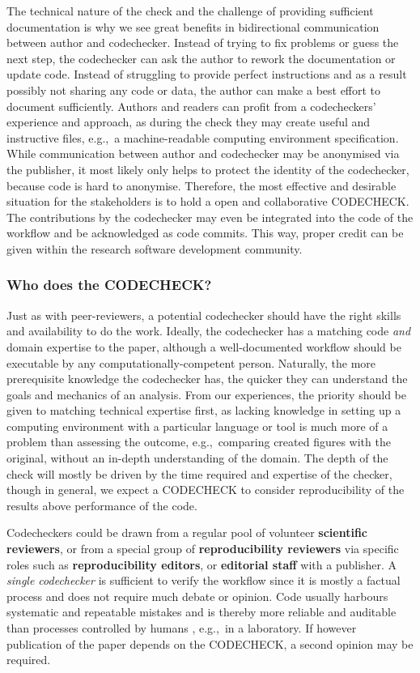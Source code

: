 \documentclass[12pt]{article}
\begin{document}
The technical nature of the check and the challenge of providing sufficient documentation is why we see great benefits in bidirectional communication between author and codechecker.
Instead of trying to
fix problems or guess the next step, the codechecker can ask the author to 
rework the documentation or update code.
Instead of struggling to provide perfect instructions and as a result possibly not sharing any code or data, the author can make a best effort to document sufficiently.
Authors and readers can profit from a codecheckers' experience and approach, as during the check they may create useful and instructive files, e.g.,~a machine-readable computing environment specification.
While communication between author and codechecker may be anonymised via
the publisher, it most likely only helps to protect the identity of
the codechecker, because code is hard to anonymise.
Therefore, the most effective and desirable situation for the
stakeholders is to hold a open and collaborative CODECHECK.
The contributions by the codechecker may even be integrated into
the code of the workflow and be acknowledged as code commits. This way, 
proper credit can be given within the research software development community.


\subsubsection*{Who does the CODECHECK?}\label{who-does-the-codecheck}

Just as with peer-reviewers, a potential codechecker should have the
right skills and availability to do the work.  Ideally, the
codechecker has a matching code \emph{and} domain expertise to the
paper, although a well-documented workflow should be executable by any
computationally-competent person. Naturally, the more
prerequisite knowledge the codechecker has, the quicker they can
understand the goals and mechanics of an analysis.  From our
experiences, the priority should be given to matching technical
expertise first, as lacking knowledge in setting up a computing
environment with a particular language or tool is much more of a
problem than assessing the outcome, e.g.,~comparing created figures
with the original, without an in-depth understanding of the domain.
The depth of the check will mostly be driven by the time required and
expertise of the checker, though in general, we expect a CODECHECK 
to consider reproducibility of the results above performance of the code.


Codecheckers could be drawn from a regular pool of volunteer
\textbf{scientific reviewers}, or from a special group of
\textbf{reproducibility reviewers} via specific roles such as
\textbf{reproducibility editors}, or \textbf{editorial staff} with a
publisher.  A \emph{single codechecker} is sufficient to verify the
workflow since it is mostly a factual process and does not require much
debate or opinion.  Code usually harbours systematic and repeatable
mistakes and is thereby more reliable and auditable than processes
controlled by humans \cite{tibav:42484}, e.g.,~in a laboratory.  If
however publication of the paper depends on the CODECHECK, a second
opinion may be required.
\end{document}
